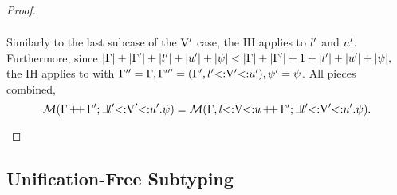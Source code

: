 \begin{proof}
\begin{itemize}
\[\begin{array}{c}
                \end{array}    
            \]
            Similarly to the last subcase of the $\mathrm{V}'$ case, the IH applies
            to $l'$ and $u'$.
            Furthermore, since $|\Gamma| + |\Gamma'| + 
            |l'| + |u'| + |\psi| <
            |\Gamma| + |\Gamma'| + 1 + |l'| + |u'|
            + |\psi|,$
            the IH applies to \tysig with $\Gamma'' = \Gamma, 
            \Gamma''' = (\Gamma', l'{\operatorname{<:}}\mathrm{V}'{\operatorname{<:}}u'), 
            \psi' = \psi$.
            All pieces combined, 
            \[\operatorname{\mathcal{M}}(\Gamma\operatorname{+\!+}\Gamma';\exists l'{\operatorname{<:}}\mathrm{V}'{\operatorname{<:}}u'.\psi) =
            \operatorname{\mathcal{M}}(\Gamma, l{\operatorname{<:}}\mathrm{V}{\operatorname{<:}}u\operatorname{+\!+}\Gamma';\exists l'{\operatorname{<:}}\mathrm{V}'{\operatorname{<:}}u'.\psi).\]
    \end{itemize}
\end{proof}

\subsection{Unification-Free Subtyping}\label{subsec:app:proofs:subty}

